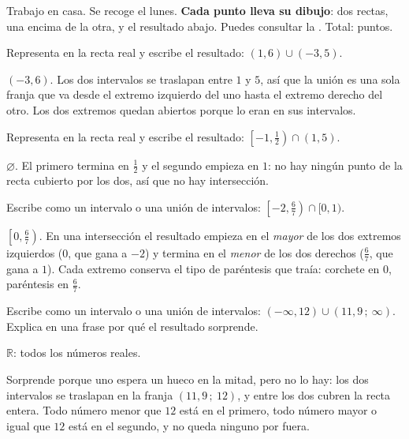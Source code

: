 \documentclass[11pt]{article}
\begin{document}
\encabezado

\begin{instrucciones}
Trabajo en casa. Se recoge el lunes. \textbf{Cada punto lleva su dibujo}: dos rectas, una
encima de la otra, y el resultado abajo. Puedes consultar la .
Total: \totalpuntos{} puntos.
\end{instrucciones}

\begin{preguntas}

\pregunta[0.75] Representa en la recta real y escribe el resultado: $(1, 6) \cup (-3, 5)$.
\begin{solucion}[3.5cm]
$(-3, 6)$. Los dos intervalos se traslapan entre $1$ y $5$, así que la unión es una sola
franja que va desde el extremo izquierdo del uno hasta el extremo derecho del otro. Los dos
extremos quedan abiertos porque lo eran en sus intervalos.
\end{solucion}

\pregunta[0.75] Representa en la recta real y escribe el resultado:
$\left[-1, \frac{1}{2}\right) \cap (1, 5)$.
\begin{solucion}[3.5cm]
$\varnothing$. El primero termina en $\frac{1}{2}$ y el segundo empieza en $1$: no hay ningún
punto de la recta cubierto por los dos, así que no hay intersección.
\end{solucion}

\pregunta[1] Escribe como un intervalo o una unión de intervalos:
$\left[-2, \frac{6}{7}\right) \cap [0, 1)$.
\begin{solucion}[4cm]
$\left[0, \frac{6}{7}\right)$. En una intersección el resultado empieza en el \emph{mayor} de
los dos extremos izquierdos ($0$, que gana a $-2$) y termina en el \emph{menor} de los dos
derechos ($\frac{6}{7}$, que gana a $1$). Cada extremo conserva el tipo de paréntesis que
traía: corchete en $0$, paréntesis en $\frac{6}{7}$.
\end{solucion}

\pregunta[1.25] Escribe como un intervalo o una unión de intervalos:
$(-\infty, 12) \cup (11{,}9\,;\ \infty)$. Explica en una frase por qué el resultado sorprende.
\begin{solucion}[4.5cm]
$\mathbb{R}$: todos los números reales.

Sorprende porque uno espera un hueco en la mitad, pero no lo hay: los dos intervalos se
traslapan en la franja $(11{,}9\,;\ 12)$, y entre los dos cubren la recta entera. Todo número
menor que $12$ está en el primero, todo número mayor o igual que $12$ está en el segundo, y no
queda ninguno por fuera.
\end{solucion}


\end{preguntas}
\end{document}
